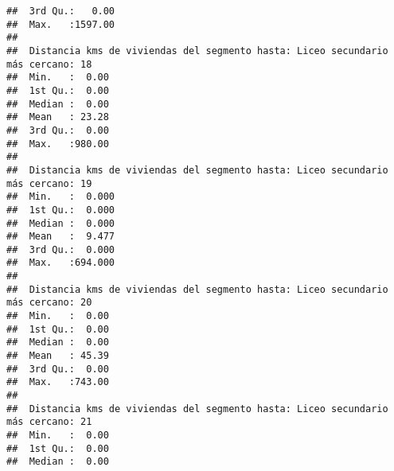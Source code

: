 \documentclass[11pt,]{article}
\begin{document}
\begin{verbatim}
##  3rd Qu.:   0.00                                                                
##  Max.   :1597.00                                                                
##                                                                                 
##  Distancia kms de viviendas del segmento hasta: Liceo secundario más cercano: 18
##  Min.   :  0.00                                                                 
##  1st Qu.:  0.00                                                                 
##  Median :  0.00                                                                 
##  Mean   : 23.28                                                                 
##  3rd Qu.:  0.00                                                                 
##  Max.   :980.00                                                                 
##                                                                                 
##  Distancia kms de viviendas del segmento hasta: Liceo secundario más cercano: 19
##  Min.   :  0.000                                                                
##  1st Qu.:  0.000                                                                
##  Median :  0.000                                                                
##  Mean   :  9.477                                                                
##  3rd Qu.:  0.000                                                                
##  Max.   :694.000                                                                
##                                                                                 
##  Distancia kms de viviendas del segmento hasta: Liceo secundario más cercano: 20
##  Min.   :  0.00                                                                 
##  1st Qu.:  0.00                                                                 
##  Median :  0.00                                                                 
##  Mean   : 45.39                                                                 
##  3rd Qu.:  0.00                                                                 
##  Max.   :743.00                                                                 
##                                                                                 
##  Distancia kms de viviendas del segmento hasta: Liceo secundario más cercano: 21
##  Min.   :  0.00                                                                 
##  1st Qu.:  0.00                                                                 
##  Median :  0.00                                                                 

\end{verbatim}
\end{document}
